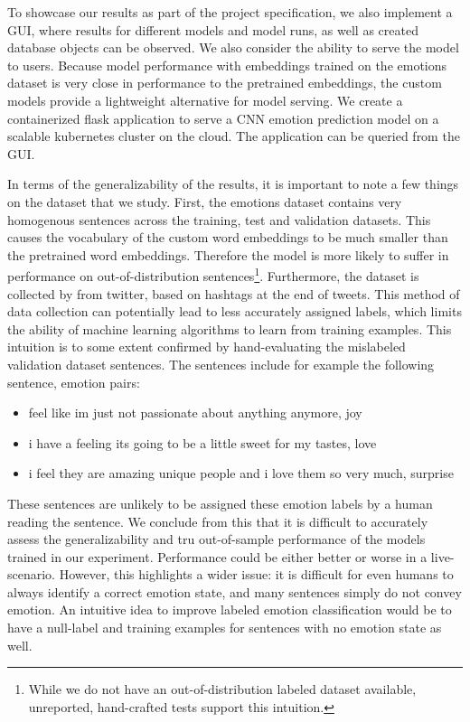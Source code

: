 \documentclass[conference]{IEEEtran}
\begin{document}
To showcase our results as part of the project specification, we also implement a GUI, where results for different models and model runs, as well as created database objects can be observed. We also consider the ability to serve the model to users. Because model performance with embeddings trained on the emotions dataset is very close in performance to the pretrained embeddings, the custom models provide a lightweight alternative for model serving. We create a containerized flask application to serve a CNN emotion prediction model on a scalable kubernetes cluster on the cloud. The application can be queried from the GUI.

In terms of the generalizability of the results, it is important to note a few things on the dataset that we study. First, the emotions dataset contains very homogenous sentences across the training, test and validation datasets. This causes the vocabulary of the custom word embeddings to be much smaller than the pretrained word embeddings. Therefore the model is more likely to suffer in performance on out-of-distribution sentences\footnote{While we do not have an out-of-distribution labeled dataset available, unreported, hand-crafted tests support this intuition.}. Furthermore, the dataset is collected by \cite{kaggledata} from twitter, based on hashtags at the end of tweets. This method of data collection can potentially lead to less accurately assigned labels, which limits the ability of machine learning algorithms to learn from training examples. This intuition is to some extent confirmed by hand-evaluating the mislabeled validation dataset sentences. The sentences include for example the following sentence, emotion pairs:
\begin{itemize}
\item feel like im just not passionate about anything anymore, joy
\item i have a feeling its going to be a little sweet for my tastes, love
\item i feel they are amazing unique people and i love them so very much, surprise
\end{itemize}

These sentences are unlikely to be assigned these emotion labels by a human reading the sentence. We conclude from this that it is difficult to accurately assess the generalizability and tru out-of-sample performance of the models trained in our experiment. Performance could be either better or worse in a live-scenario. However, this highlights a wider issue: it is difficult for even humans to always identify a correct emotion state, and many sentences simply do not convey emotion. An intuitive idea to improve labeled emotion classification would be to have a null-label and training examples for sentences with no emotion state as well.
\end{document}
